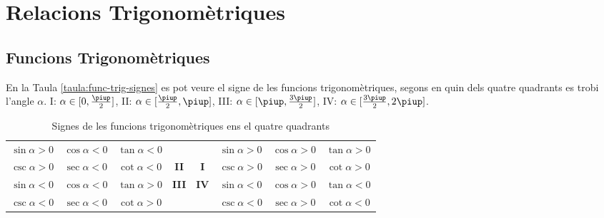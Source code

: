 \chapter{Relacions Trigonom\`{e}triques}

\section{Funcions Trigonom\`{e}triques}

En la Taula \vref{taula:func-trig-signes} es pot veure el signe de
les funcions trigonom\`{e}triques, segons en quin dels quatre quadrants
es trobi l'angle $\alpha$. I: $\alpha\in[0,\frac{\piup}{2}]$, II:
$\alpha\in[\frac{\piup}{2},\piup]$, III:
$\alpha\in[\piup,\frac{3\piup}{2}]$, IV:
$\alpha\in[\frac{3\piup}{2},2\piup]$.

\begin{table}[h]
   \caption{\label{taula:func-trig-signes} Signes de les funcions trigonom\`{e}triques ens el quatre quadrants}
   \begin{center}\begin{tabular}{cccc|cccc}
   $\sin\alpha > 0$ & $\cos\alpha < 0$ & $\tan\alpha < 0$ & & &
   $\sin\alpha > 0$ & $\cos\alpha > 0$ & $\tan\alpha > 0$ \\
   $\csc\alpha > 0$ & $\sec\alpha < 0$ & $\cot\alpha < 0$ & \textbf{II}&
   \textbf{I} & $\csc\alpha > 0$ & $\sec\alpha > 0$ & $\cot\alpha > 0$ \\
   \hline
   $\sin\alpha < 0$ & $\cos\alpha < 0$ & $\tan\alpha > 0$
   &\textbf{III} &
   \textbf{IV} & $\sin\alpha < 0$ & $\cos\alpha > 0$ & $\tan\alpha < 0$ \\
   $\csc\alpha < 0$ & $\sec\alpha < 0$ & $\cot\alpha > 0$  & & &
   $\csc\alpha < 0$ & $\sec\alpha > 0$ & $\cot\alpha < 0$
   \end{tabular} \end{center}
\end{table}


